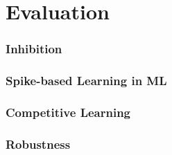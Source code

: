 {}
\section{Evaluation}
\label{sec:evaluation}

\subsubsection{Inhibition}

\subsubsection{Spike-based Learning in ML}

\subsubsection{Competitive Learning}

\subsubsection{Robustness}